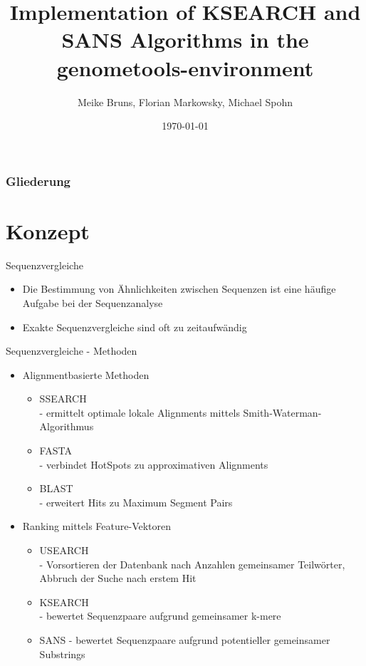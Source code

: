 \documentclass[aspectratio=1610]{beamer}
\author{Meike Bruns, Florian Markowsky, Michael Spohn}
\title{Implementation of KSEARCH and SANS Algorithms in the genometools-environment}
\date{\today}
\begin{document}

\maketitle

\begin{frame}
	\frametitle{Gliederung}
	\tableofcontents
\end{frame}

\section{Konzept}

\begin{frame}{Sequenzvergleiche}
  \begin{itemize}
    \item Die Bestimmung von Ähnlichkeiten zwischen Sequenzen ist eine häufige Aufgabe bei der Sequenzanalyse 
    \item Exakte Sequenzvergleiche sind oft zu zeitaufwändig
  \end{itemize}
\end{frame}

\begin{frame}{Sequenzvergleiche - Methoden}
  \begin{itemize}
    \item Alignmentbasierte Methoden
      \begin{itemize}
        \item SSEARCH\\
              - ermittelt optimale lokale Alignments mittels Smith-Waterman-Algorithmus
        \item FASTA\\
              - verbindet HotSpots zu approximativen Alignments
        \item BLAST\\
              - erweitert Hits zu Maximum Segment Pairs
      \end{itemize}
    \item Ranking mittels Feature-Vektoren
      \begin{itemize}
        \item USEARCH\\
              - Vorsortieren der Datenbank nach Anzahlen gemeinsamer Teilwörter, Abbruch der Suche nach erstem Hit
        \item KSEARCH\\
              - bewertet Sequenzpaare aufgrund gemeinsamer k-mere
        \item SANS
              - bewertet Sequenzpaare aufgrund potentieller gemeinsamer Substrings
      \end{itemize}
  \end{itemize}
\end{frame}
\end{document}
